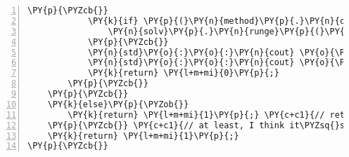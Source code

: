 \begin{Verbatim}[tabsize=2,commandchars=\\\{\},numbers=left,firstnumber=1,stepnumber=1]
			\PY{p}{\PYZcb{}}
			\PY{k}{if} \PY{p}{(}\PY{n}{method}\PY{p}{.}\PY{n}{compare}\PY{p}{(}\PY{l+s}{\PYZdq{}}\PY{l+s}{runge\PYZhy{}kutta}\PY{l+s}{\PYZdq{}}\PY{p}{)} \PY{o}{=}\PY{o}{=} \PY{l+m+mi}{0}\PY{p}{)}\PY{p}{\PYZob{}}
				\PY{n}{solv}\PY{p}{.}\PY{n}{runge}\PY{p}{(}\PY{n}{y}\PY{p}{,} \PY{n}{f}\PY{p}{,} \PY{n}{j}\PY{p}{)}\PY{p}{;}
			\PY{p}{\PYZcb{}}
			\PY{n}{std}\PY{o}{:}\PY{o}{:}\PY{n}{cout} \PY{o}{\PYZlt{}}\PY{o}{\PYZlt{}} \PY{l+s}{\PYZdq{}}\PY{l+s}{y(x): }\PY{l+s}{\PYZdq{}} \PY{o}{\PYZlt{}}\PY{o}{\PYZlt{}} \PY{n}{y}\PY{p}{[}\PY{l+m+mi}{0}\PY{p}{]} \PY{o}{\PYZlt{}}\PY{o}{\PYZlt{}} \PY{n}{std}\PY{o}{:}\PY{o}{:}\PY{n}{endl}\PY{p}{;} 
			\PY{n}{std}\PY{o}{:}\PY{o}{:}\PY{n}{cout} \PY{o}{\PYZlt{}}\PY{o}{\PYZlt{}} \PY{l+s}{\PYZdq{}}\PY{l+s}{y\PYZsq{}(x): }\PY{l+s}{\PYZdq{}} \PY{o}{\PYZlt{}}\PY{o}{\PYZlt{}} \PY{n}{y}\PY{p}{[}\PY{l+m+mi}{1}\PY{p}{]} \PY{o}{\PYZlt{}}\PY{o}{\PYZlt{}} \PY{n}{std}\PY{o}{:}\PY{o}{:}\PY{n}{endl}\PY{p}{;}
			\PY{k}{return} \PY{l+m+mi}{0}\PY{p}{;}
		\PY{p}{\PYZcb{}}
	\PY{p}{\PYZcb{}}
	\PY{k}{else}\PY{p}{\PYZob{}}
		\PY{k}{return} \PY{l+m+mi}{1}\PY{p}{;} \PY{c+c1}{// return 1 after unexpected input, as per unix rules}
	\PY{p}{\PYZcb{}} \PY{c+c1}{// at least, I think it\PYZsq{}s a unix thing}
	\PY{k}{return} \PY{l+m+mi}{1}\PY{p}{;}
\PY{p}{\PYZcb{}}
\end{Verbatim}
